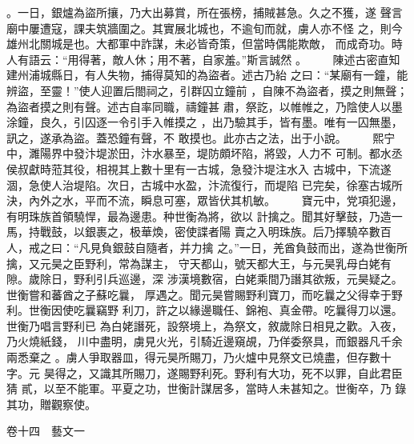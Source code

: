 \documentclass{ctexart}
\begin{document}
。一日，銀爐為盜所攘，乃大出募賞，所在張榜，捕賊甚急。久之不獲，遂 聲言廟中屢遭寇，課夫筑牆圍之。其實展北城也，不逾旬而就，虜人亦不怪 之，則今雄州北關城是也。大都軍中詐謀，未必皆奇策，但當時偶能欺敵， 而成奇功。時人有語云：``用得著，敵人休；用不著，自家羞。''斯言誠然 。 　　陳述古密直知建州浦城縣日，有人失物，捕得莫知的為盜者。述古乃紿 之曰：``某廟有一鐘，能辨盜，至靈！''使人迎置后閤祠之，引群囚立鐘前 ，自陳不為盜者，摸之則無聲；為盜者摸之則有聲。述古自率同職，禱鐘甚 肅，祭訖，以帷帷之，乃陰使人以墨涂鐘，良久，引囚逐一令引手入帷摸之 ，出乃驗其手，皆有墨。唯有一囚無墨，訊之，遂承為盜。蓋恐鐘有聲，不 敢摸也。此亦古之法，出于小說。 　　熙宁中，濉陽界中發汴堤淤田，汴水暴至，堤防頗坏陷，將毀，人力不 可制。都水丞侯叔獻時蒞其役，相視其上數十里有一古城，急發汴堤注水入 古城中，下流遂涸，急使人治堤陷。次日，古城中水盈，汴流復行，而堤陷 已完矣，徐塞古城所決，內外之水，平而不流，瞬息可塞，眾皆伏其机敏。 　　寶元中，党項犯邊，有明珠族首領驍悍，最為邊患。种世衡為將，欲以 計擒之。聞其好擊鼓，乃造一馬，持戰鼓，以銀裹之，极華煥，密使諜者陽 賣之入明珠族。后乃擇驍卒數百人，戒之曰：``凡見負銀鼓自隨者，并力擒 之。''一日，羌酋負鼓而出，遂為世衡所擒，又元昊之臣野利，常為謀主， 守天都山，號天都大王，与元昊乳母白姥有隙。歲除日，野利引兵巡邊，深 涉漢境數宿，白姥乘間乃譖其欲叛，元昊疑之。世衡嘗和蕃酋之子蘇吃曩， 厚遇之。聞元昊嘗賜野利寶刀，而吃曩之父得幸于野利。世衡因使吃曩竊野 利刀，許之以緣邊職任、錦袍、真金帶。吃曩得刀以還。世衡乃唱言野利已 為白姥譖死，設祭境上，為祭文，敘歲除日相見之歡。入夜，乃火燒紙錢， 川中盡明，虜見火光，引騎近邊窺覘，乃佯委祭具，而銀器凡千余兩悉棄之 。虜人爭取器皿，得元昊所賜刀，乃火爐中見祭文已燒盡，但存數十字。元 昊得之，又識其所賜刀，遂賜野利死。野利有大功，死不以罪，自此君臣猜 貳，以至不能軍。平夏之功，世衡計謀居多，當時人未甚知之。世衡卒，乃 錄其功，贈觀察使。

卷十四　藝文一
\end{document}
